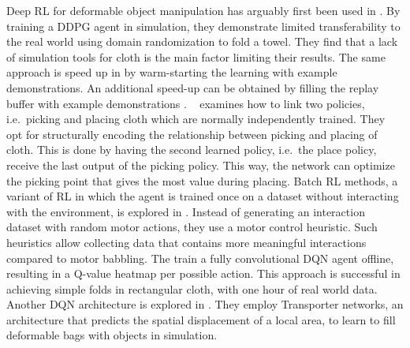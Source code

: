 \documentclass[\home/main.tex]{subfiles}
\begin{document}
Deep RL for deformable object manipulation has arguably first been used in \autocite{Matas2018}. By training a DDPG agent in simulation, they demonstrate limited transferability to the real world using domain randomization to fold a towel. They find that a lack of simulation tools for cloth is the main factor limiting their results. The same approach is speed up in \autocite{Jangir2020} by warm-starting the learning with example demonstrations. An additional speed-up can be obtained by filling the replay buffer with example demonstrations \autocite{Tsurumine2019}. ~\textcite{Wu2020} examines how to link two policies, i.e.\ picking and placing cloth which are normally independently trained. They opt for structurally encoding the relationship between picking and placing of cloth. This is done by having the second learned policy, i.e.\ the place policy, receive the last output of the picking policy. This way, the network can optimize the picking point that gives the most value during placing. Batch RL methods, a variant of RL in which the agent is trained once on a dataset without interacting with the environment, is explored in \autocite{lee2020learning}. Instead of generating an interaction dataset with random motor actions, they use a motor control heuristic. Such heuristics allow collecting data that contains more meaningful interactions compared to motor babbling. The train a fully convolutional DQN agent offline, resulting in a Q-value heatmap per possible action. This approach is successful in achieving simple folds in rectangular cloth, with one hour of real world data. Another DQN architecture is explored in \autocite{seita2021learning}. They employ Transporter networks, an architecture that predicts the spatial displacement of a local area, to learn to fill deformable bags with objects in simulation.
\end{document}
